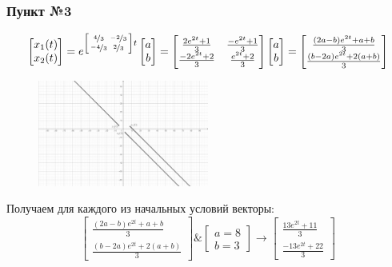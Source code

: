\documentclass[a3paper,14pt]{extarticle}
\begin{document}
\subsubsection*{Пункт №3}
$$\begin{bmatrix}
    x_1(t) \\ x_2(t)
\end{bmatrix} = e^{\left[\begin{smallmatrix}
    \nicefrac{4}{3} & \nicefrac{-2}{3} \\ \nicefrac{-4}{3} & \nicefrac{2}{3}
\end{smallmatrix}\right]t}\begin{bmatrix}
    a \\ b
\end{bmatrix} = \begin{bmatrix}
    \frac{2e^{2t}+1}{3} & \frac{-e^{2t}+1}{3} \\ \frac{-2e^{2t}+2}{3} & \frac{e^{2t}+2}{3}
\end{bmatrix}\begin{bmatrix}
    a \\ b
\end{bmatrix} = \begin{bmatrix}
    \frac{(2a-b)e^{2t}+a+b}{3} \\ \frac{(b-2a)e^{2t}+2(a+b)}{3}
\end{bmatrix}$$
\begin{figure}
    \centering
    \includegraphics[width=0.5\textwidth]{2.3.png}
\end{figure}
Получаем для каждого из начальных условий векторы: $$\begin{bmatrix}
    \frac{(2a-b)e^{2t}+a+b}{3} \\ \frac{(b-2a)e^{2t}+2(a+b)}{3}
\end{bmatrix} \& \begin{bmatrix}
    a = 8 \\ b = 3
\end{bmatrix} \rightarrow \begin{bmatrix}
    \frac{13e^{2t}+11}{3} \\ \frac{-13e^{2t}+22}{3}
\end{bmatrix}$$
\end{document}
